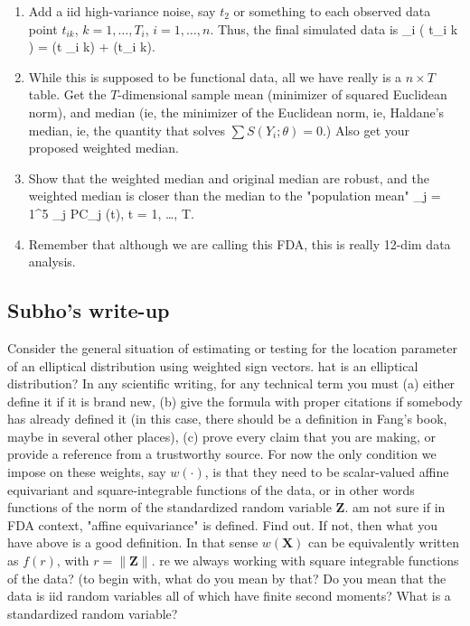 \documentclass[12pt,letterpaper]{article}
\newcommand{\bfX}{{\mathbf {X}}}
\newcommand{\bfZ}{{\mathbf {Z}}}
\def\ban#1\ean{\begin{align*}#1\end{align*}}
\def\bredbf#1\eredbf{{\color{red}{\bf ???? #1 ????}}}
\theoremstyle{Example}
\begin{document}
\begin{enumerate}
\item
Add a iid high-variance noise, say $t_{2}$ or something to each observed data point 
$t_{i k}$, $k =1, \ldots, T_{i}$, $i =1, \ldots, n$. Thus, the final simulated data is 
\ban 
Y_{i}  ( t_{i k} ) = \xi (t _{i k}) + \varepsilon (t_{i k}).
\ean

\item While this is supposed to be functional data, all we have really is a 
$n \times T$  table. Get the $T$-dimensional sample mean (minimizer of squared 
Euclidean norm), and median (ie, 
the minimizer of the Euclidean norm,  ie, Haldane's median, ie, the quantity that 
solves $\sum S(Y_{i} ; \theta) = 0$.) Also get your proposed weighted median.

\item Show that the weighted median and original median are robust, and the weighted 
median is closer than the median to the "population mean" 
\ban 
\sum_{j = 1}^{5} \beta_{j} PC_{j} (t), t = 1, \ldots, T.
\ean

\item Remember that although we are calling this FDA, this is really 12-dim data 
analysis. 
\end{enumerate}

\subsection{Subho's write-up}


Consider the general situation of estimating or testing for the location parameter of 
an elliptical distribution using weighted sign vectors. 
\bredbf
What is an elliptical distribution? In any scientific writing, for any technical term 
you must (a) either define it if it is brand new, (b) give the formula with proper 
citations if somebody has already defined it (in this case, there should be a definition 
in Fang's book, maybe in several other places), (c) prove every claim that you are making, 
or provide a reference from a trustworthy source.
\eredbf
For now the only condition 
we impose on these weights, say $w( \cdot)$, is that they need to be scalar-valued 
affine equivariant and square-integrable functions of the data, or in other words 
functions of the norm of the standardized random variable $\bfZ$.
\bredbf 
I am not sure if in FDA context, "affine equivariance" is defined. Find out. If not, then 
what you have above is a good definition. 
\eredbf
 In that sense $w(\bfX)$ can be equivalently written as $f(r)$, with $r = \| \bfZ \|$. 
 \bredbf 
 Are we always working with square integrable functions of the data? (to begin with, what 
 do you mean by that? Do you mean that the data is iid random variables all of which 
 have finite second moments? What is a standardized random variable? 
 \eredbf
 
\end{document}
